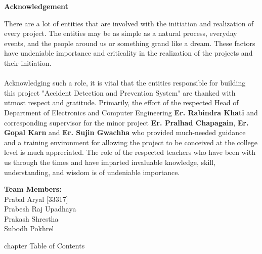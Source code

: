 \documentclass[12pt,a4paper]{report}
\begin{document}
\begin{FlushLeft}
     \textbf{\fontsize{16}{1.5pt}\selectfont Acknowledgement}
\end{FlushLeft}
	\begin{justify}
    There are a lot of entities that are involved with the initiation and realization of every project. The entities may be as simple as a natural process, everyday events, and the people around us or something grand like a dream. These factors have undeniable importance and criticality in the realization of the projects and their initiation.\\\\
    Acknowledging such a role, it is vital that the entities responsible for building this project "Accident Detection and Prevention System" are thanked with utmost respect and gratitude. Primarily, the effort of the respected Head of Department of Electronics and Computer Engineering \textbf{Er. Rabindra Khati} and corresponding supervisor for the minor project \textbf{Er. Pralhad Chapagain}, \textbf{Er. Gopal Karn} and \textbf{Er. Sujin Gwachha} who provided much-needed guidance and a training environment for allowing the project to be conceived at the college level is much appreciated. The role of the respected teachers who have been with us through the times and have imparted invaluable knowledge, skill, understanding, and wisdom is of undeniable importance.\\
		
	\end{justify}
	\begin{FlushLeft}
		\textbf{Team Members:}	 \\
		Prabal Aryal \hspace{1.8cm}[33317]  \\
		Prabesh Raj Upadhaya \selectfont{ [33318]}\\
		Prakash Shrestha \hspace{1.1cm}\selectfont{[33319]}\\
        Subodh Pokhrel \hspace{1.3cm}\selectfont{[33327]}
	\end{FlushLeft}
	
	
	\pagebreak
	\thispagestyle{empty}
	 {chapter} {Table of Contents}
	
\end{document}

